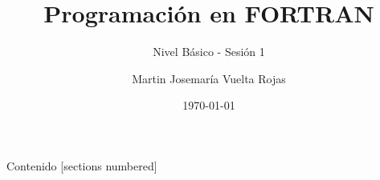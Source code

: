 \documentclass[10pt,aspectratio=96]{beamer}
\begin{document}
  \title{Programación en FORTRAN}
  \subtitle{
    Nivel Básico - Sesión 1
  }
  \date{\today}
  \author{Martin Josemaría Vuelta Rojas}
  \maketitle

  \begin{frame}{Contenido}
    [sections numbered]
    \tableofcontents[hideallsubsections]
  \end{frame}

  
  
  
  
  
  
  
  
  
\end{document}
